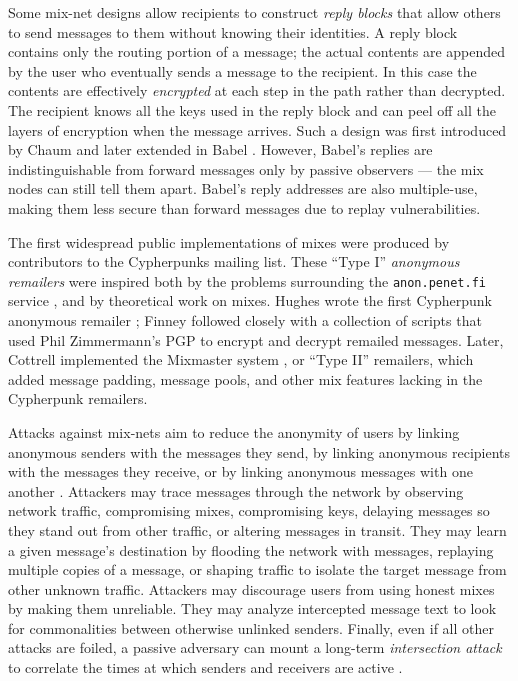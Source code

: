 \documentclass[times,10pt,twocolumn]{article}
\begin{document}
Some mix-net designs allow recipients to construct \emph{reply blocks}
that allow others to send messages to them without knowing their
identities. A reply block contains only the routing portion of a message;
the actual contents are appended by the user who eventually sends a
message to the recipient. In this case the contents are effectively
\emph{encrypted} at each step in the path rather than decrypted.
The recipient knows all the keys used in the reply block and can peel
off all the layers of encryption when the message arrives. Such a design
was first introduced by Chaum \cite{chaum-mix} and later extended in
Babel \cite{babel}. However, Babel's replies are indistinguishable from
forward messages only by passive observers --- the mix nodes can still
tell them apart. Babel's reply addresses are also multiple-use, making them
less secure than forward messages due to replay vulnerabilities.

The first widespread public implementations of mixes were produced by
contributors to the Cypherpunks mailing list. These ``Type I''
\emph{anonymous remailers} 
were inspired both by the problems surrounding the {\tt anon.penet.fi}
service \cite{helsingius}, and by theoretical work on mixes. Hughes
wrote the first Cypherpunk anonymous remailer \cite{remailer-history};
Finney followed closely with a collection of scripts that used Phil
Zimmermann's PGP to encrypt and decrypt remailed messages. Later, Cottrell
implemented the Mixmaster system \cite{mixmaster-attacks,mixmaster-spec},
or ``Type II'' remailers, which added message padding, message pools,
and other mix features lacking in the Cypherpunk remailers.


Attacks against mix-nets aim to reduce the anonymity of users by
linking anonymous senders with the messages they send, by linking
anonymous recipients with the messages they receive, or by linking
anonymous messages with one another \cite{raymond00}.  Attackers may
trace messages through the network by observing network
traffic, compromising mixes, compromising keys, delaying messages
so they stand out from other traffic, or altering messages
in transit.  They may learn a given message's destination
by flooding the network with messages, replaying multiple copies
of a message, or shaping traffic to isolate the target message from
other unknown traffic. Attackers may discourage users from
using honest mixes by making them unreliable. They may analyze
intercepted message text to look for commonalities between otherwise
unlinked senders.
Finally, even if all other attacks are foiled, a passive adversary can
mount a long-term \emph{intersection attack} to correlate the times at
which senders and receivers are active \cite{disad-free-routes}.
\end{document}

